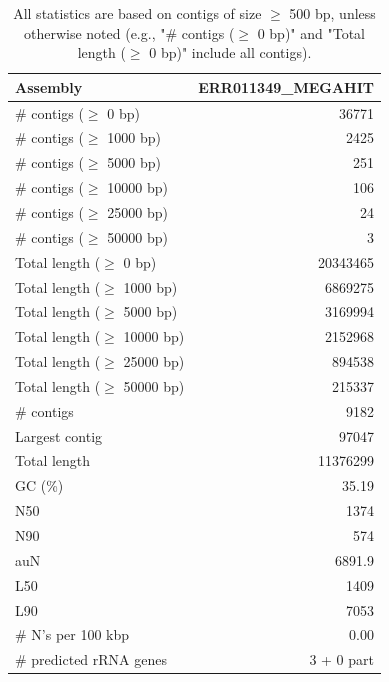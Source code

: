 \documentclass[12pt,a4paper]{article}
\begin{document}
\begin{table}[ht]
\begin{center}
\caption{All statistics are based on contigs of size $\geq$ 500 bp, unless otherwise noted (e.g., "\# contigs ($\geq$ 0 bp)" and "Total length ($\geq$ 0 bp)" include all contigs).}
\begin{tabular}{|l*{1}{|r}|}
\hline
Assembly & ERR011349\_MEGAHIT \\ \hline
\# contigs ($\geq$ 0 bp) & 36771 \\ \hline
\# contigs ($\geq$ 1000 bp) & 2425 \\ \hline
\# contigs ($\geq$ 5000 bp) & 251 \\ \hline
\# contigs ($\geq$ 10000 bp) & 106 \\ \hline
\# contigs ($\geq$ 25000 bp) & 24 \\ \hline
\# contigs ($\geq$ 50000 bp) & 3 \\ \hline
Total length ($\geq$ 0 bp) & 20343465 \\ \hline
Total length ($\geq$ 1000 bp) & 6869275 \\ \hline
Total length ($\geq$ 5000 bp) & 3169994 \\ \hline
Total length ($\geq$ 10000 bp) & 2152968 \\ \hline
Total length ($\geq$ 25000 bp) & 894538 \\ \hline
Total length ($\geq$ 50000 bp) & 215337 \\ \hline
\# contigs & 9182 \\ \hline
Largest contig & 97047 \\ \hline
Total length & 11376299 \\ \hline
GC (\%) & 35.19 \\ \hline
N50 & 1374 \\ \hline
N90 & 574 \\ \hline
auN & 6891.9 \\ \hline
L50 & 1409 \\ \hline
L90 & 7053 \\ \hline
\# N's per 100 kbp & 0.00 \\ \hline
\# predicted rRNA genes & 3 + 0 part \\ \hline
\end{tabular}
\end{center}
\end{table}
\end{document}
